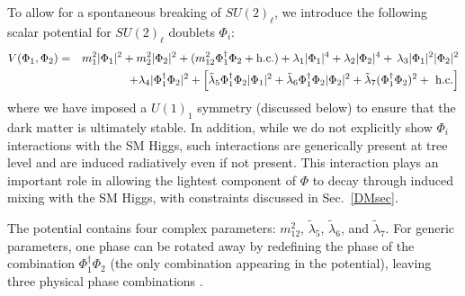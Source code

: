 \documentclass[prd,showpcs,amsmath,amssymb,nofootinbib,preprintnumbers,balancelastpage,longbibliography,superscriptaddress,notitlepage]{revtex4}
\def\bea{\begin{eqnarray}}
\def\eea{\end{eqnarray}}
\def\bea{\begin{eqnarray}}
\def\eea{\end{eqnarray}}
\begin{document}
To allow for a spontaneous breaking of $SU(2)_\ell$, we introduce the following scalar potential for $SU(2)_\ell$ doublets $\Phi_i$:
\bea
V(\Phi_1,\Phi_2) &=&  m_1^2 |\Phi_1|^2 + m_2^2 |\Phi_2|^2+ (m_{12}^2 \Phi_1^\dagger \Phi_2 + \rm{h.c.}) + \lambda_1 |\Phi_1|^4 +\lambda_2 |\Phi_2|^4 +\,\lambda_3 |\Phi_1|^2  |\Phi_2|^2  \nonumber\\
 && + \lambda_4 |\Phi_1^\dagger\Phi_2|^2 +  \Big[ \tilde{\lambda}_5 \Phi_1^\dagger \Phi_2 |\Phi_1|^2 +\tilde{\lambda}_6 \Phi_1^\dagger \Phi_2 |\Phi_2|^2 + \tilde{\lambda}_7 (\Phi_1^\dagger \Phi_2)^2 + \ {\rm h.c.}\Big]
 \label{eq:V}
\eea
where we have imposed a $U(1)_1$ symmetry (discussed below) to ensure that the dark matter is ultimately stable.
In addition, while we do not explicitly show $\Phi_i$ interactions with the SM Higgs, such interactions are generically present at tree level and are induced radiatively even if not present.  This interaction plays an important role
in allowing the lightest component of $\Phi$ to decay through induced mixing with the SM Higgs, with constraints discussed in Sec.~\ref{DMsec}.


The potential contains four complex parameters: $m_{12}^2$, $\tilde{\lambda}_5$, $\tilde{\lambda}_6$, and $\tilde{\lambda}_7$. 
For generic parameters, one phase
can be rotated away by redefining the phase of the combination $\Phi_1^\dagger \Phi_2$ (the only combination appearing in
the potential), leaving three physical phase combinations \cite{Gunion:2005ja}.
\end{document}
